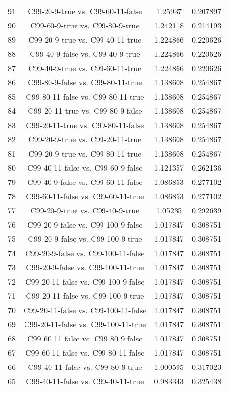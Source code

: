 \documentclass[a4paper,10pt]{article}
\begin{document}
\begin{landscape}
\begin{table}[!htp]
\begin{tabular}{cccc}
91&C99-20-9-true vs. C99-60-11-false&1.25937&0.207897\\
90&C99-60-9-true vs. C99-80-9-true&1.242118&0.214193\\
89&C99-20-9-true vs. C99-40-11-true&1.224866&0.220626\\
88&C99-40-9-false vs. C99-40-9-true&1.224866&0.220626\\
87&C99-40-9-true vs. C99-60-11-true&1.224866&0.220626\\
86&C99-80-9-false vs. C99-80-11-true&1.138608&0.254867\\
85&C99-80-11-false vs. C99-80-11-true&1.138608&0.254867\\
84&C99-20-11-true vs. C99-80-9-false&1.138608&0.254867\\
83&C99-20-11-true vs. C99-80-11-false&1.138608&0.254867\\
82&C99-20-9-true vs. C99-20-11-true&1.138608&0.254867\\
81&C99-20-9-true vs. C99-80-11-true&1.138608&0.254867\\
80&C99-40-11-false vs. C99-60-9-false&1.121357&0.262136\\
79&C99-40-9-false vs. C99-60-11-false&1.086853&0.277102\\
78&C99-60-11-false vs. C99-60-11-true&1.086853&0.277102\\
77&C99-20-9-true vs. C99-40-9-true&1.05235&0.292639\\
76&C99-20-9-false vs. C99-100-9-false&1.017847&0.308751\\
75&C99-20-9-false vs. C99-100-9-true&1.017847&0.308751\\
74&C99-20-9-false vs. C99-100-11-false&1.017847&0.308751\\
73&C99-20-9-false vs. C99-100-11-true&1.017847&0.308751\\
72&C99-20-11-false vs. C99-100-9-false&1.017847&0.308751\\
71&C99-20-11-false vs. C99-100-9-true&1.017847&0.308751\\
70&C99-20-11-false vs. C99-100-11-false&1.017847&0.308751\\
69&C99-20-11-false vs. C99-100-11-true&1.017847&0.308751\\
68&C99-60-11-false vs. C99-80-9-false&1.017847&0.308751\\
67&C99-60-11-false vs. C99-80-11-false&1.017847&0.308751\\
66&C99-40-11-false vs. C99-80-9-true&1.000595&0.317023\\
65&C99-40-11-false vs. C99-40-11-true&0.983343&0.325438\\

\end{tabular}
\end{table}
\end{landscape}
\end{document}
